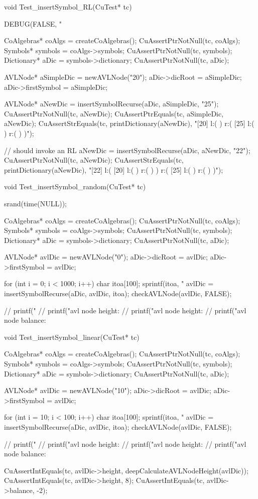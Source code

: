 void Test_insertSymbol_RL(CuTest* tc) {
  DEBUG(FALSE, "\n%

  CoAlgebras* coAlgs = createCoAlgebras();
  CuAssertPtrNotNull(tc, coAlgs);
  Symbols* symbols = coAlgs->symbols;
  CuAssertPtrNotNull(tc, symbols);
  Dictionary* aDic = symbols->dictionary;
  CuAssertPtrNotNull(tc, aDic);

  AVLNode* aSimpleDic = newAVLNode("20");
  aDic->dicRoot     = aSimpleDic;
  aDic->firstSymbol = aSimpleDic;

  AVLNode* aNewDic = insertSymbolRecurse(aDic, aSimpleDic, "25");
  CuAssertPtrNotNull(tc, aNewDic);
  CuAssertPtrEquals(tc, aSimpleDic, aNewDic);
  CuAssertStrEquals(tc, printDictionary(aNewDic),
  "[20] l:(  ) r:( [25] l:(  ) r:(  )  )");

  // should invoke an RL
  aNewDic = insertSymbolRecurse(aDic, aNewDic, "22");
  CuAssertPtrNotNull(tc, aNewDic);
  CuAssertStrEquals(tc, printDictionary(aNewDic),
  "[22] l:( [20] l:(  ) r:(  )  ) r:( [25] l:(  ) r:(  )  )");
}

void Test_insertSymbol_random(CuTest* tc) {

  srand(time(NULL));

  CoAlgebras* coAlgs = createCoAlgebras();
  CuAssertPtrNotNull(tc, coAlgs);
  Symbols* symbols = coAlgs->symbols;
  CuAssertPtrNotNull(tc, symbols);
  Dictionary* aDic = symbols->dictionary;
  CuAssertPtrNotNull(tc, aDic);

  AVLNode* avlDic = newAVLNode("0");
  aDic->dicRoot     = avlDic;
  aDic->firstSymbol = avlDic;

  for (int i = 0; i < 1000; i++) {
    char itoa[100];
    sprintf(itoa, "%
    avlDic = insertSymbolRecurse(aDic, avlDic, itoa);
  }
  checkAVLNode(avlDic, FALSE);

//  printf("%
//  printf("avl node height: %
//  printf("avl node height: %
//  printf("avl node balance: %
}


void Test_insertSymbol_linear(CuTest* tc) {
  CoAlgebras* coAlgs = createCoAlgebras();
  CuAssertPtrNotNull(tc, coAlgs);
  Symbols* symbols = coAlgs->symbols;
  CuAssertPtrNotNull(tc, symbols);
  Dictionary* aDic = symbols->dictionary;
  CuAssertPtrNotNull(tc, aDic);

  AVLNode* avlDic = newAVLNode("10");
  aDic->dicRoot     = avlDic;
  aDic->firstSymbol = avlDic;

  for (int i = 10; i < 100; i++) {
    char itoa[100];
    sprintf(itoa, "%
    avlDic = insertSymbolRecurse(aDic, avlDic, itoa);
  }
  checkAVLNode(avlDic, FALSE);

//  printf("%
//  printf("avl node height: %
//  printf("avl node height: %
//  printf("avl node balance: %

  CuAssertIntEquals(tc, avlDic->height, deepCalculateAVLNodeHeight(avlDic));
  CuAssertIntEquals(tc, avlDic->height, 8);
  CuAssertIntEquals(tc, avlDic->balance, -2);
}

\stoptyping